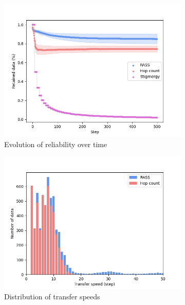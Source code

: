 \documentclass[letterpaper, 10 pt, conference]{ieeeconf}
\begin{document}
\begin{figure}
    \centering
    \begin{subfigure}{0.30\textwidth}
        \includegraphics[width=\textwidth]{figures/scale_reliability.png}
        \caption{Evolution of reliability over time}
        \label{results:scale_100_reliability}
    \end{subfigure}
    \begin{subfigure}{0.30\textwidth}
        \includegraphics[width=\textwidth]{figures/scale_speed.png}
        \caption{Distribution of transfer speeds}
        \label{results:scale_100_speed}
    \end{subfigure}
    \begin{subfigure}{0.30\textwidth}

\end{subfigure}
\end{figure}
\end{document}
